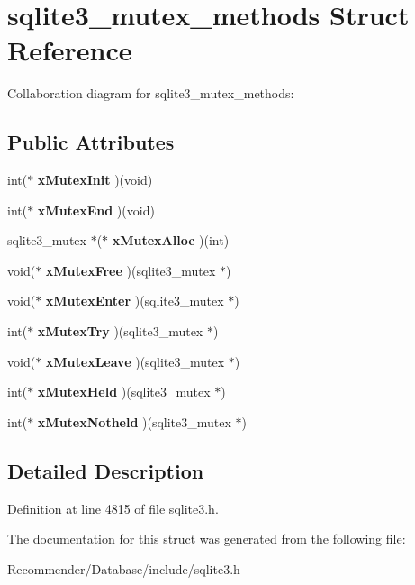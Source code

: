 \section{sqlite3\_\-mutex\_\-methods Struct Reference}
\label{structsqlite3__mutex__methods}
Collaboration diagram for sqlite3\_\-mutex\_\-methods:\subsection*{Public Attributes}
\begin{CompactItemize}
\item 
int($\ast$ \textbf{xMutexInit} )(void)\label{structsqlite3__mutex__methods_ca650adcfdb8f1558549b53df3a90544}

\item 
int($\ast$ \textbf{xMutexEnd} )(void)\label{structsqlite3__mutex__methods_c92c39796f740decb37d5b6040f7eece}

\item 
sqlite3\_\-mutex $\ast$($\ast$ \textbf{xMutexAlloc} )(int)\label{structsqlite3__mutex__methods_eda2daeed007b85dacac8b0bafc9f9ff}

\item 
void($\ast$ \textbf{xMutexFree} )(sqlite3\_\-mutex $\ast$)\label{structsqlite3__mutex__methods_926165ded3bd55b79919e25404263d5c}

\item 
void($\ast$ \textbf{xMutexEnter} )(sqlite3\_\-mutex $\ast$)\label{structsqlite3__mutex__methods_7d4855948658b13b5f171b63f485a1aa}

\item 
int($\ast$ \textbf{xMutexTry} )(sqlite3\_\-mutex $\ast$)\label{structsqlite3__mutex__methods_f739cd32a41c65eb92aa0dbcf22cdfc7}

\item 
void($\ast$ \textbf{xMutexLeave} )(sqlite3\_\-mutex $\ast$)\label{structsqlite3__mutex__methods_8f5dbd79462481b7b67b619528812561}

\item 
int($\ast$ \textbf{xMutexHeld} )(sqlite3\_\-mutex $\ast$)\label{structsqlite3__mutex__methods_bfbaad1736d82afa5b689d754b17196b}

\item 
int($\ast$ \textbf{xMutexNotheld} )(sqlite3\_\-mutex $\ast$)\label{structsqlite3__mutex__methods_37187ad856ffb0ddb9c8d8d63b681025}

\end{CompactItemize}


\subsection{Detailed Description}




Definition at line 4815 of file sqlite3.h.

The documentation for this struct was generated from the following file:\begin{CompactItemize}
\item 
Recommender/Database/include/sqlite3.h\end{CompactItemize}
